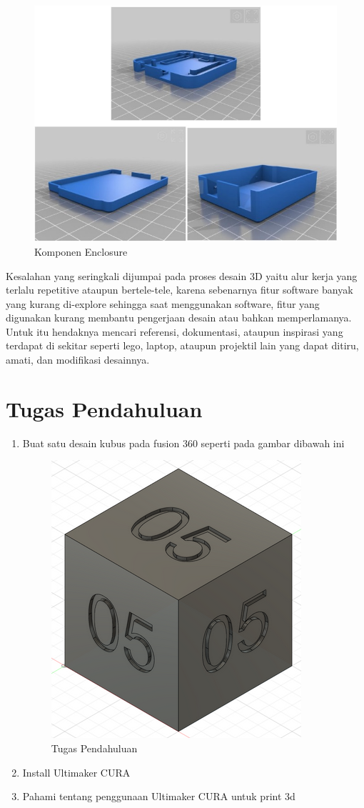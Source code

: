 \begin{figure}[H]
    \centering
    \includegraphics[width=1\linewidth]{P3/img/image2.jpg}
    \caption{Komponen Enclosure}
    \label{fig:Komponen Enclosure}
\end{figure}

Kesalahan yang seringkali dijumpai pada proses desain 3D yaitu alur kerja yang terlalu repetitive ataupun
bertele-tele, karena sebenarnya fitur software banyak yang kurang di-explore sehingga saat
menggunakan software, fitur yang digunakan kurang membantu pengerjaan desain atau bahkan
memperlamanya. Untuk itu hendaknya mencari referensi, dokumentasi, ataupun inspirasi yang terdapat
di sekitar seperti lego, laptop, ataupun projektil lain yang dapat ditiru, amati, dan modifikasi desainnya.

\section{Tugas Pendahuluan}
\begin{enumerate}
    \item Buat satu desain kubus pada fusion 360 seperti pada gambar dibawah ini
        \begin{figure}[H]
            \centering
            \includegraphics[width=0.25\linewidth]{P3/img/soal1.png}
            \caption{Tugas Pendahuluan}
            \label{fig:Tugas Pendahuluan}
        \end{figure}
    
    \item Install Ultimaker CURA
    \item Pahami tentang penggunaan Ultimaker CURA untuk print 3d
\end{enumerate}

